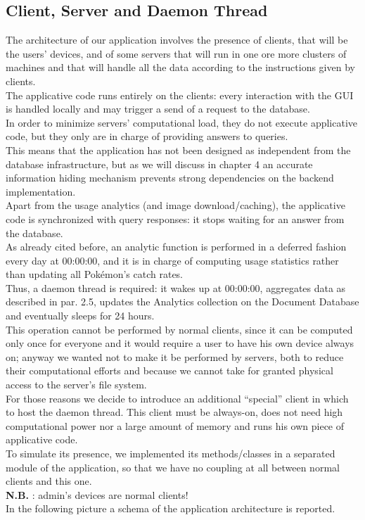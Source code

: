 \subsection{Client, Server and Daemon Thread}
The architecture of our application involves the presence of clients, that will be the users’ devices, and of some servers that will run in one ore more clusters of machines and that will handle all the data according to the instructions given by clients.\\
The applicative code runs entirely on the clients: every interaction with the GUI is handled locally and may trigger a send of a request to the database.\\
In order to minimize servers’ computational load, they do not execute applicative code, but they only are in charge of providing answers to queries.\\
This means that the application has not been designed as independent from the database infrastructure, but as we will discuss in chapter 4 an accurate information hiding mechanism prevents strong dependencies on the backend implementation.\\
Apart from the usage analytics (and image download/caching), the applicative code is synchronized with query responses: it stops waiting for an answer from the database. \medskip \\
As already cited before, an analytic function is performed in a deferred fashion every day at 00:00:00, and it is in charge of computing usage statistics rather than updating all Pokémon’s catch rates. \\
Thus, a daemon thread is required: it wakes up at 00:00:00, aggregates data as described in par. 2.5, updates the Analytics collection on the Document Database and eventually sleeps for 24 hours.\\
This operation cannot be performed by normal clients, since it can be computed only once for everyone and it would require a user to have his own device always on; anyway we wanted not to make it be performed by servers, both to reduce their computational efforts and because we cannot take for granted physical access to the server’s file system. \medskip \\

For those reasons we decide to introduce an additional “special” client in which to host the daemon thread. This client must be always-on, does not need high computational power nor a large amount of memory and runs his own piece of applicative code.\\
To simulate its presence, we implemented its methods/classes in a separated module of the application, so that we have no coupling at all between normal clients and this one. \\
\textbf{N.B.} : admin’s devices are normal clients!\\
In the following picture a schema of the application architecture is reported.

